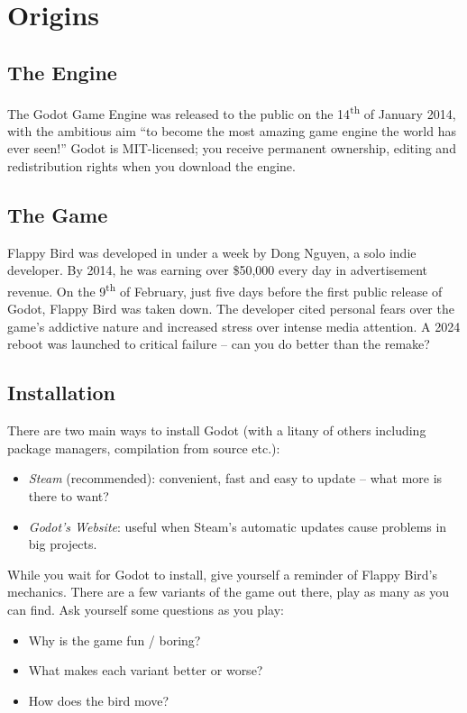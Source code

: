\documentclass[14pt]{extarticle}
\begin{document}


\section{Origins}
\subsection*{The Engine}
The Godot Game Engine was released to the public on the 14\textsuperscript{th} of January 2014, with the ambitious aim ``to become the most amazing game engine the world has ever seen!''\cite{first-public-release-godot} Godot is MIT-licensed; you receive permanent ownership, editing and redistribution rights when you download the engine.

\subsection*{The Game}
Flappy Bird was developed in under a week by Dong Nguyen, a solo indie developer. By 2014, he was earning over \$50,000 every day in advertisement revenue. On the 9\textsuperscript{th} of February, just five days before the first public release of Godot, Flappy Bird was taken down. The developer cited personal fears over the game's addictive nature and increased stress over intense media attention.\cite{flappy-bird-creator-speaks-out} A 2024 reboot was launched to critical failure\cite{flappy-bird-reboot-techradar}\cite{flappy-bird-trademark-vultures} -- can you do better than the remake?

\subsection*{Installation}
There are two main ways to install Godot (with a litany of others including package managers, compilation from source etc.):
\begin{itemize}
  \item[--] \emph{Steam} (recommended): convenient, fast and easy to update -- what more is there to want?
  \item[--] \emph{Godot's Website}: useful when Steam's automatic updates cause problems in big projects.
\end{itemize}
While you wait for Godot to install, give yourself a reminder of Flappy Bird's mechanics. There are a few variants of the game out there, play as many as you can find. Ask yourself some questions as you play:
\begin{itemize}
  \item[--] Why is the game fun / boring?
  \item[--] What makes each variant better or worse?
  \item[--] How does the bird move?
\end{itemize}
\end{document}
